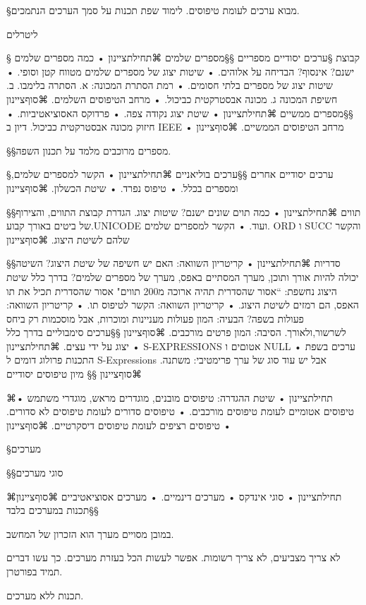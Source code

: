 §מבוא
ערכים לעומת טיפוסים.
לימוד שפת תכנות על סמך הערכים הנתמכים.

ליטרלים

§ קבוצת
§ערכים יסודיים מספריים
§§מספרים שלמים
⌘תחילת{ציינון}
• כמה מספרים שלמים ישנם? אינסוף? הבדיחה על אלוהים.
• שיטות יצוג של מספרים שלמים מטווח קטן וסופי.
• שיטות יצוג של מספרים בלתי חסומים.
• רמת הסתרת המכונה: א. הסתרה בלימבו. ב. חשיפת המכונה ג. מכונה אבסטרקטית
כביכול.
• מרחב הטיפוסים השלמים.
⌘סוף{ציינון}
§§מספרים ממשיים
⌘תחילת{ציינון}
• שיטת יצוג נקודה צפה.
• פרדוקס האסוציאטיביות.
• חיזוק מכונה אבסטרקטית כביכול. דיון ב IEEE
• מרחב הטיפוסים הממשיים.
⌘סוף{ציינון}

§§מספרים מרוכבים
מלמד על תכנון השפה.

§ערכים יסודיים אחרים
§§ערכים בוליאניים
⌘תחילת{ציינון}
• הקשר למספרים שלמים, ומספרים בכלל.
• טיפוס נפרד.
• שיטת הכשלון.
⌘סוף{ציינון}

§§תווים
⌘תחילת{ציינון}
• כמה תוים שונים ישנם? שיטות יצוג. הגדרת קבוצת התווים, והצירוף של ביטים
באורך קבוע.UNICODE ועוד.
• הקשר למספרים שלמים. ORD ו SUCC והקשר שלהם לשיטת היצוג.
⌘סוף{ציינון}

§§סדריות
⌘תחילת{ציינון}
• קריטריון השוואה: האם יש חשיפה של שיטת היצוג? השיטה יכולה להיות אורך
ותוכן, מערך המסתיים באפס, מערך של מספרים שלמים? בדרך כלל שיטת היצוג נחשפת: “אסור
שהסדרית תהיה ארוכה מ200 תווים" אסור שהסדרית תכיל את תו האפס, הם רמזים לשיטת
היצוג.
• קריטריון השוואה: הקשר לטיפוס תו.
• קריטריון השוואה: פעולות בשפה? הבעיה: המון פעולות מעניינות ומוכרות, אבל
מוסכמות רק ביחס לשרשור,ולאורך. הסיבה: המון פרטים מורכבים.
⌘סוף{ציינון}
§§ערכים סימבוליים
בדרך כלל יצוג על ידי עצים.
⌘תחילת{ציינון}
• S-EXPRESSIONS
אטוםים ו
NULL
• ערכים בשפת התכנות פרולוג
דומים ל
S-Expressions
אבל יש עוד סוג של ערך פרימטיבי: משתנה.
⌘סוף{ציינון}
§§ מיון טיפוסים יסודיים

⌘תחילת{ציינון}
• שיטת ההגדרה: טיפוסים מובנים, מוגדרים מראש, מוגדרי משתמש
• טיפוסים אטומיים לעומת טיפוסים מורכבים.
• טיפוסים סדורים לעומת טיפוסים לא סדורים.
• טיפוסים רציפים לעומת טיפוסים דיסקרטיים.
⌘סוף{ציינון}

§מערכים

§§סוגי מערכים

⌘תחילת{ציינון}
• סוגי אינדקס
• מערכים דינמיים.
• מערכים אסוציאטיביים
⌘סוף{ציינון}
§§תכנות במערכים בלבד

במובן מסויים מערך הוא הזכרון של המחשב.

לא צריך מצביעים, לא צריך רשומות. אפשר לעשות הכל בעזרת מערכים. כך עשו דברים תמיד
בפורטרן.

תכנות ללא מערכים.

